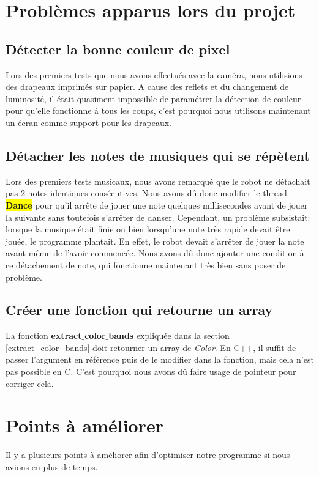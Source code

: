 \documentclass{article}
\begin{document}
    \section{Problèmes apparus lors du projet}
    
    \label{problème_couleurs}
    \subsection{Détecter la bonne couleur de pixel}
    Lors des premiers tests que nous avons effectués avec la caméra, nous utilisions des drapeaux imprimés sur papier. 
    A cause des reflets et du changement de luminosité, il était quasiment impossible de paramétrer la détection de couleur pour qu'elle fonctionne à tous les coups, c'est pourquoi nous utilisons maintenant un écran comme support pour les drapeaux.
    
    \subsection{Détacher les notes de musiques qui se répètent}
    Lors des premiers tests musicaux, nous avons remarqué que le robot ne détachait pas 2 notes identiques consécutives. Nous avons dû donc modifier le thread \colorbox{yellow}{\textbf{Dance}} pour qu'il arrête de jouer une note quelques millisecondes avant de jouer la suivante sans toutefois s'arrêter de danser. Cependant, un problème subsistait: lorsque la musique était finie ou bien lorsqu'une note très rapide devait être jouée, le programme plantait. En effet, le robot devait s'arrêter de jouer la note avant même de l'avoir commencée. Nous avons dû donc ajouter une condition à ce détachement de note, qui fonctionne maintenant très bien sans poser de problème.
    
    \subsection{Créer une fonction qui retourne un array}
    La fonction \textbf{extract$\_$color$\_$bands} expliquée dans la section \ref{extract_color_bands} doit retourner un array de \textit{Color}. En C++, il suffit de passer l'argument en référence puis de le modifier dans la fonction, mais cela n'est pas possible en C. C'est pourquoi nous avons dû faire usage de pointeur pour corriger cela.
    
    \section{Points à améliorer}
    Il y a plusieurs points à améliorer afin d'optimiser notre programme si nous avions eu plus de temps.
\end{document}
